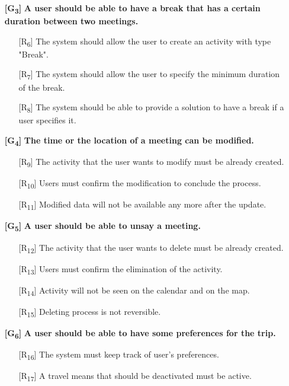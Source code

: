 \documentclass[12pt,titlepage]{article}
\begin{document}
\begin{itemize}
\item[\textbf{ {[G\textsubscript{3}]}}]	\textbf{	A user should be able to have a break that has a certain duration between two meetings.}
\begin{itemize}
\item[{[R\textsubscript{6}]}]  The system should allow the user to create an activity with type "Break".
\item[{[R\textsubscript{7}]}]  The system should allow the user to specify the minimum duration of the break.
\item[{[R\textsubscript{8}]}]  The system should be able to provide a solution to have a break if a user specifies it.
\end{itemize}
\item[\textbf{ {[G\textsubscript{4}]}}]	\textbf{	The time or the location of a meeting can be modified.}
\begin{itemize}
\item[{[R\textsubscript{9}]}] The activity that the user wants to modify must be already created.
\item[{[R\textsubscript{10}]}] Users must confirm the modification to conclude the process.
\item[{[R\textsubscript{11}]}] Modified data will not be available any more after the update.
\end{itemize}
\item[\textbf{ {[G\textsubscript{5}]}}]	\textbf{	A user should be able to unsay a meeting.}
\begin{itemize}
\item[{[R\textsubscript{12}]}] The activity that the user wants to delete must be already created.
\item[{[R\textsubscript{13}]}] Users must confirm the elimination of the activity.
\item[{[R\textsubscript{14}]}] Activity will not be seen on the calendar and on the map.
\item[{[R\textsubscript{15}]}] Deleting process is not reversible.
\end{itemize}
\item[\textbf{ {[G\textsubscript{6}]}}]	\textbf{A user should be able to have some preferences for the trip.}
\begin{itemize}
\item[{[R\textsubscript{16}]}]  The system must keep track of user's preferences.
\item[{[R\textsubscript{17}]}] A travel means that should be deactivated must be active.

\end{itemize}
\end{itemize}
\end{document}
